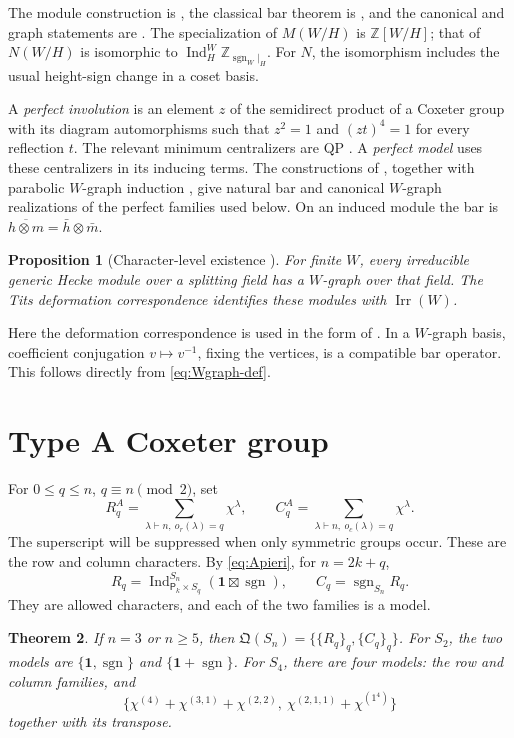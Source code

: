 \documentclass[11pt]{article}
\numberwithin{equation}{section}
\newtheorem{theorem}{Theorem}[section]
\newtheorem{proposition}[theorem]{Proposition}
\theoremstyle{definition}
\DeclareMathOperator{\Ind}{Ind}
\DeclareMathOperator{\Irr}{Irr}
\DeclareMathOperator{\sgn}{sgn}
\newcommand{\Z}{\mathbb Z}
\newcommand{\QQ}{\mathfrak Q}
\newcommand{\one}{\mathbf 1}
\newcommand{\pair}{\mathsf P}
\begin{document}
The module construction is \cite[Theorem 7.1]{RV}, the classical bar theorem is \cite[Theorem 18]{Lu}, and the canonical and graph statements are \cite[Theorems 3.14, 3.16, 3.26]{MarbergBar}.
The specialization of \(M(W/H)\) is \(\Z[W/H]\); that of \(N(W/H)\) is isomorphic to \(\Ind_H^W\Z_{\sgn_W|_H}\).
For \(N\), the isomorphism includes the usual height-sign change in a coset basis.

A \emph{perfect involution} is an element \(z\) of the semidirect product of a Coxeter group with its diagram automorphisms such that \(z^2=1\) and \((zt)^4=1\) for every reflection \(t\).
The relevant minimum centralizers are QP \cite{RV}.
A \emph{perfect model} uses these centralizers in its inducing terms.
The constructions of \cite{MZgraphs}, together with parabolic \(W\)-graph induction \cite{HY1,HY2}, give natural bar and canonical \(W\)-graph realizations of the perfect families used below.
On an induced module the bar is
\(\overline{h\otimes m}=\bar h\otimes\bar m\).

\begin{proposition}[Character-level existence {\cite{Gyoja,Hahn}}]
\label{prop:Gyoja}
For finite \(W\), every irreducible generic Hecke module over a splitting field has a \(W\)-graph over that field.
The Tits deformation correspondence identifies these modules with \(\Irr(W)\).
\end{proposition}

Here the deformation correspondence is used in the form of \cite{GeckPfeiffer}.
In a \(W\)-graph basis, coefficient conjugation \(v\mapsto v^{-1}\), fixing the vertices, is a compatible bar operator.
This follows directly from \eqref{eq:Wgraph-def}.
\section{Type A Coxeter group}
\label{sec:A}

For \(0\leq q\leq n\), \(q\equiv n\pmod2\), set
\[
 R_q^A=\sum_{\lambda\vdash n,\ o_r(\lambda)=q}\chi^\lambda,
 \qquad C_q^A=\sum_{\lambda\vdash n,\ o_c(\lambda)=q}\chi^\lambda.
\]
The superscript will be suppressed when only symmetric groups occur.
These are the row and column characters.
By \eqref{eq:Apieri}, for \(n=2k+q\),
\[
 R_q=\Ind_{\pair_k\times S_q}^{S_n}(\one\boxtimes\sgn),
 \qquad C_q=\sgn_{S_n}R_q .
\]
They are allowed characters, and each of the two families is a model.

\begin{theorem}\label{thm:A}
If \(n=3\) or \(n\geq5\), then
\(\QQ(S_n)=\{\{R_q\}_q,\{C_q\}_q\}\).
For \(S_2\), the two models are \(\{\one,\sgn\}\) and \(\{\one+\sgn\}\).
For \(S_4\), there are four models: the row and column families, and
\[
 \{\chi^{(4)}+\chi^{(3,1)}+\chi^{(2,2)},\
       \chi^{(2,1,1)}+\chi^{(1^4)}\}
\]
together with its transpose.
\end{theorem}
\end{document}
